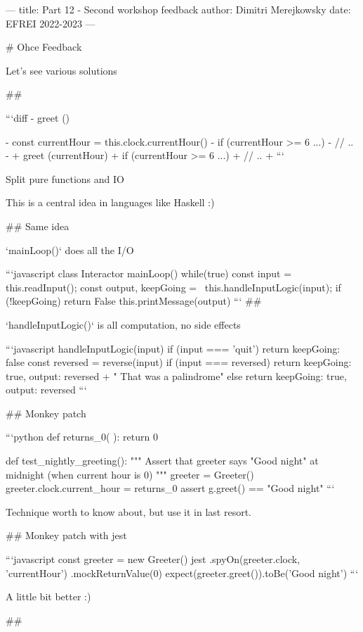 ---
title: Part 12 - Second workshop feedback
author: Dimitri Merejkowsky
date: EFREI 2022-2023
---

# Ohce Feedback

Let's see various solutions

##

```diff
-  greet () {
-    const currentHour = this.clock.currentHour()
-    if (currentHour >= 6 ...) {
-    // ..
-  }
+  greet (currentHour)
+    if (currentHour >= 6 ...) {
+    // ..
+  }
```

Split pure functions and IO

This is a central idea in languages like Haskell :)

## Same idea

`mainLoop()` does all the I/O

```javascript
class Interactor
  mainLoop() {
   while(true) {
     const input = this.readInput();
     const { output, keepGoing } = \
       this.handleInputLogic(input);
     if (!keepGoing) {
        return False
     }
     this.printMessage(output)
  }
}
```
##

`handleInputLogic()` is all computation, no side effects

```javascript
handleInputLogic(input) {
  if (input === 'quit') {
    return { keepGoing: false }
  }
  const reversed = reverse(input)
  if (input === reversed) {
    return {
      keepGoing: true,
      output: reversed + " That was a palindrome"
    }
  }
  else {
    return {
      keepGoing: true,
      output: reversed
    }
  }
}
```

## Monkey patch

```python
def returns_0( ):
    return 0

def test_nightly_greeting():
    """
    Assert that greeter says "Good night" at midnight
    (when current hour is 0)
    """
    greeter = Greeter()
    greeter.clock.current_hour = returns_0
    assert g.greet() == "Good night"
```

\vfill

Technique worth to know about, but use it in last resort.

## Monkey patch with jest

```javascript
const greeter = new Greeter()
jest
  .spyOn(greeter.clock, 'currentHour')
  .mockReturnValue(0)
expect(greeter.greet()).toBe('Good night')
```

\vfill

A little bit better :)

##

}
